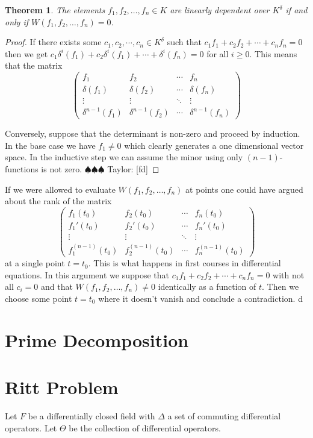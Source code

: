\documentclass[]{article}
\newcommand{\taylor}[1]{{\color{blue} \sf $\spadesuit\spadesuit\spadesuit$ Taylor: [#1]}}
\numberwithin{equation}{section}
\newtheorem{theorem}{Theorem}[subsection]
\theoremstyle{definition}
\theoremstyle{remark}
\begin{document}
\begin{theorem}
The elements $f_1,f_2,\ldots, f_n \in K$ are linearly dependent over $K^{\delta}$ if and only if $W(f_1,f_2,\ldots,f_n)=0$. 
\end{theorem}
\begin{proof}
	If there exists some $c_1,c_2, \cdots, c_n \in K^{\delta}$ such that $c_1 f_1 +c_2 f_2 + \cdots + c_n f_n=0$ then we get $c_1 \delta^i(f_1) + c_2 \delta^i(f_1) + \cdots + \delta^i(f_n)=0$ for all $i\geq 0$. 
	This means that the matrix 
	$$  \begin{pmatrix}
	f_1 & f_2 & \cdots & f_n \\
	\delta(f_1) & \delta(f_2) & \cdots & \delta(f_n) \\
	\vdots & \vdots & \ddots & \vdots \\
	\delta^{n-1}(f_1) & \delta^{n-1}(f_2) & \cdots & \delta^{n-1}(f_n)
	\end{pmatrix} $$
	
	Conversely, suppose that the determinant is non-zero and proceed by induction. 
	In the base case we have $f_1\neq 0$ which clearly generates a one dimensional vector space. 
	In the inductive step we can assume the minor using only $(n-1)$-functions is not zero. \taylor{fd} 
\end{proof}

If we were allowed to evaluate $W(f_1,f_2,\ldots,f_n)$ at points one could have argued about the rank of the matrix
  $$\begin{pmatrix}
 	f_1(t_0) & f_2(t_0) & \cdots & f_n(t_0) \\
 	f_1'(t_0) & f_2'(t_0) & \cdots & f_n'(t_0) \\
 	\vdots & \vdots & \ddots & \vdots \\
 	f_1^{(n-1)}(t_0) & f_2^{(n-1)}(t_0) & \cdots & f_n^{(n-1)}(t_0)
 \end{pmatrix} $$
at a single point $t=t_0$.
This is what happens in first courses in differential equations.
In this argument we suppose that $c_1 f_1+c_2f_2+\cdots + c_n f_n=0$ with not all $c_i=0$ and that $W(f_1,f_2,\ldots,f_n)\neq 0$ identically as a function of $t$.
Then we choose some point $t=t_0$ where it doesn't vanish and conclude a contradiction.
d


\section{Prime Decomposition}

\section{Ritt Problem}
Let $F$ be a differentially closed field with $\Delta$ a set of commuting differential operators. 
Let $\Theta$ be the collection of differential operators. 
\end{document}

